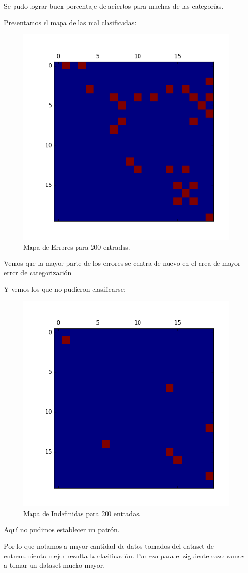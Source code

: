 Se pudo lograr buen porcentaje de aciertos para muchas de las categorías.

Presentamos el mapa de las mal clasificadas:


\begin{figure}[H]
  \centering
  \includegraphics[width=0.5\columnwidth]{secciones/graficos/kohonen/mapaerrores200.png}
  \caption{Mapa de Errores para 200 entradas.}
  \label{fig:mapa error 200}
\end{figure}

Vemos que la mayor parte de los errores se centra de nuevo en el area de 
mayor error de categorización

Y vemos los que no pudieron clasificarse:


\begin{figure}[H]
  \centering
  \includegraphics[width=0.5\columnwidth]{secciones/graficos/kohonen/mapaindefinidas200.png}
  \caption{Mapa de Indefinidas para 200 entradas.}
  \label{fig:mapa indefinidas 200}
\end{figure}

Aquí no pudimos establecer un patrón.

Por lo que notamos a mayor cantidad de datos tomados del dataset de entrenamiento
mejor resulta la clasificación. Por eso para el siguiente caso vamos a tomar un
dataset mucho mayor.


